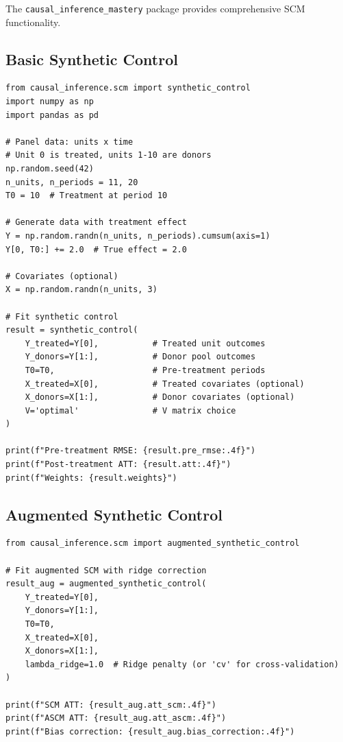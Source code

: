 The \texttt{causal\_inference\_mastery} package provides comprehensive SCM functionality.

\subsection{Basic Synthetic Control}

\begin{verbatim}
from causal_inference.scm import synthetic_control
import numpy as np
import pandas as pd

# Panel data: units x time
# Unit 0 is treated, units 1-10 are donors
np.random.seed(42)
n_units, n_periods = 11, 20
T0 = 10  # Treatment at period 10

# Generate data with treatment effect
Y = np.random.randn(n_units, n_periods).cumsum(axis=1)
Y[0, T0:] += 2.0  # True effect = 2.0

# Covariates (optional)
X = np.random.randn(n_units, 3)

# Fit synthetic control
result = synthetic_control(
    Y_treated=Y[0],           # Treated unit outcomes
    Y_donors=Y[1:],           # Donor pool outcomes
    T0=T0,                    # Pre-treatment periods
    X_treated=X[0],           # Treated covariates (optional)
    X_donors=X[1:],           # Donor covariates (optional)
    V='optimal'               # V matrix choice
)

print(f"Pre-treatment RMSE: {result.pre_rmse:.4f}")
print(f"Post-treatment ATT: {result.att:.4f}")
print(f"Weights: {result.weights}")
\end{verbatim}

\subsection{Augmented Synthetic Control}

\begin{verbatim}
from causal_inference.scm import augmented_synthetic_control

# Fit augmented SCM with ridge correction
result_aug = augmented_synthetic_control(
    Y_treated=Y[0],
    Y_donors=Y[1:],
    T0=T0,
    X_treated=X[0],
    X_donors=X[1:],
    lambda_ridge=1.0  # Ridge penalty (or 'cv' for cross-validation)
)

print(f"SCM ATT: {result_aug.att_scm:.4f}")
print(f"ASCM ATT: {result_aug.att_ascm:.4f}")
print(f"Bias correction: {result_aug.bias_correction:.4f}")
\end{verbatim}

